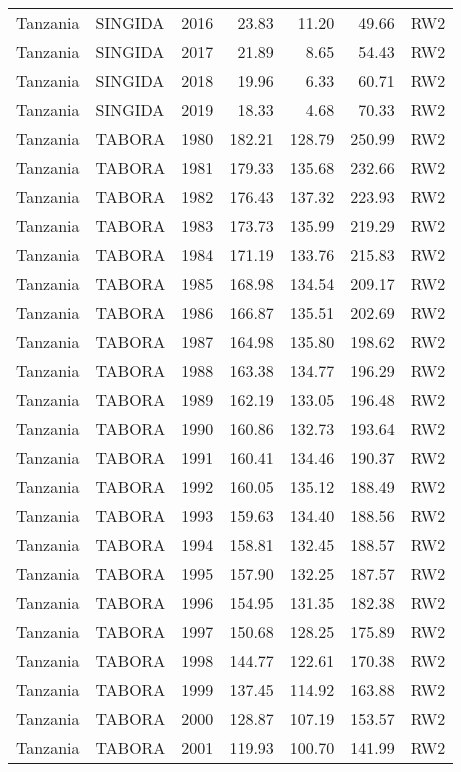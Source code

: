 \begin{longtable}{lllrrrl}
  Tanzania & SINGIDA & 2016 & 23.83 & 11.20 & 49.66 & RW2 \\ 
  Tanzania & SINGIDA & 2017 & 21.89 & 8.65 & 54.43 & RW2 \\ 
  Tanzania & SINGIDA & 2018 & 19.96 & 6.33 & 60.71 & RW2 \\ 
  Tanzania & SINGIDA & 2019 & 18.33 & 4.68 & 70.33 & RW2 \\ 
  Tanzania & TABORA & 1980 & 182.21 & 128.79 & 250.99 & RW2 \\ 
  Tanzania & TABORA & 1981 & 179.33 & 135.68 & 232.66 & RW2 \\ 
  Tanzania & TABORA & 1982 & 176.43 & 137.32 & 223.93 & RW2 \\ 
  Tanzania & TABORA & 1983 & 173.73 & 135.99 & 219.29 & RW2 \\ 
  Tanzania & TABORA & 1984 & 171.19 & 133.76 & 215.83 & RW2 \\ 
  Tanzania & TABORA & 1985 & 168.98 & 134.54 & 209.17 & RW2 \\ 
  Tanzania & TABORA & 1986 & 166.87 & 135.51 & 202.69 & RW2 \\ 
  Tanzania & TABORA & 1987 & 164.98 & 135.80 & 198.62 & RW2 \\ 
  Tanzania & TABORA & 1988 & 163.38 & 134.77 & 196.29 & RW2 \\ 
  Tanzania & TABORA & 1989 & 162.19 & 133.05 & 196.48 & RW2 \\ 
  Tanzania & TABORA & 1990 & 160.86 & 132.73 & 193.64 & RW2 \\ 
  Tanzania & TABORA & 1991 & 160.41 & 134.46 & 190.37 & RW2 \\ 
  Tanzania & TABORA & 1992 & 160.05 & 135.12 & 188.49 & RW2 \\ 
  Tanzania & TABORA & 1993 & 159.63 & 134.40 & 188.56 & RW2 \\ 
  Tanzania & TABORA & 1994 & 158.81 & 132.45 & 188.57 & RW2 \\ 
  Tanzania & TABORA & 1995 & 157.90 & 132.25 & 187.57 & RW2 \\ 
  Tanzania & TABORA & 1996 & 154.95 & 131.35 & 182.38 & RW2 \\ 
  Tanzania & TABORA & 1997 & 150.68 & 128.25 & 175.89 & RW2 \\ 
  Tanzania & TABORA & 1998 & 144.77 & 122.61 & 170.38 & RW2 \\ 
  Tanzania & TABORA & 1999 & 137.45 & 114.92 & 163.88 & RW2 \\ 
  Tanzania & TABORA & 2000 & 128.87 & 107.19 & 153.57 & RW2 \\ 
  Tanzania & TABORA & 2001 & 119.93 & 100.70 & 141.99 & RW2 \\ 

\end{longtable}
